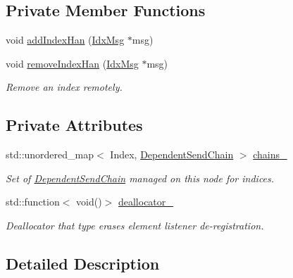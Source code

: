 \subsection*{Private Member Functions}
\begin{DoxyCompactItemize}
\item 
void \hyperlink{classvt_1_1messaging_1_1_collection_chain_set_af1b3ca58d3d018fa2a81b86d62fec4ff}{add\+Index\+Han} (\hyperlink{structvt_1_1messaging_1_1_collection_chain_set_1_1_idx_msg}{Idx\+Msg} $\ast$msg)
\item 
void \hyperlink{classvt_1_1messaging_1_1_collection_chain_set_abbc0c0995c4961fcd07f46303b06d58e}{remove\+Index\+Han} (\hyperlink{structvt_1_1messaging_1_1_collection_chain_set_1_1_idx_msg}{Idx\+Msg} $\ast$msg)
\begin{DoxyCompactList}\small\item\em Remove an index remotely. \end{DoxyCompactList}\end{DoxyCompactItemize}
\subsection*{Private Attributes}
\begin{DoxyCompactItemize}
\item 
std\+::unordered\+\_\+map$<$ Index, \hyperlink{classvt_1_1messaging_1_1_dependent_send_chain}{Dependent\+Send\+Chain} $>$ \hyperlink{classvt_1_1messaging_1_1_collection_chain_set_afd05e48d93d231320364149fd538beab}{chains\+\_\+}
\begin{DoxyCompactList}\small\item\em Set of {\ttfamily \hyperlink{classvt_1_1messaging_1_1_dependent_send_chain}{Dependent\+Send\+Chain}} managed on this node for indices. \end{DoxyCompactList}\item 
std\+::function$<$ void()$>$ \hyperlink{classvt_1_1messaging_1_1_collection_chain_set_a0c471bdf6ef26c2ca5c214bdda8eb866}{deallocator\+\_\+}
\begin{DoxyCompactList}\small\item\em Deallocator that type erases element listener de-\/registration. \end{DoxyCompactList}\end{DoxyCompactItemize}


\subsection{Detailed Description}
